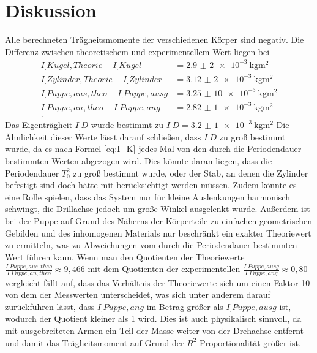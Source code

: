 \section{Diskussion}
\label{sec:Diskussion}
Alle berechneten Trägheitsmomente der verschiedenen Körper sind negativ.
Die Differenz zwischen theoretischem und experimentellem Wert liegen bei
\begin{align*}
I_.{Kugel,Theorie}-I_.{Kugel}		&=\SI{2,9(2)e-3}{\kilo\gram\metre\squared}\\
I_.{Zylinder,Theorie}-I_.{Zylinder}	&=\SI{3,12(2)e-3}{\kilo\gram\metre\squared}\\
I_.{Puppe,aus,theo}-I_.{Puppe,ausg}	&=\SI{3,25(10)e-3}{\kilo\gram\metre\squared}\\
I_.{Puppe,an,theo}-I_.{Puppe,ang}	&=\SI{2,82(1)e-3}{\kilo\gram\metre\squared}\\\text{.}
\end{align*}
Das Eigenträgheit $I_.D$ wurde bestimmt zu $I_.D=\SI{3,2(1)e-3}{\kilo\gram\metre\squared}$
Die Ähnlichkeit dieser Werte lässt darauf schließen, dass $I_.D$ zu groß bestimmt wurde, da es nach Formel \eqref{eq:I_K} jedes Mal von den durch die Periodendauer bestimmten Werten abgezogen wird.\newline
Dies könnte daran liegen, dass die Periodendauer $T_0^2$ zu groß bestimmt wurde, oder der Stab, an denen die Zylinder befestigt sind doch hätte mit berücksichtigt werden müssen. Zudem könnte es eine Rolle spielen, dass das System nur für kleine Auslenkungen harmonisch schwingt, die Drillachse jedoch um große Winkel ausgelenkt wurde.\newline
Außerdem ist bei der Puppe auf Grund des Näherns der Körperteile zu einfachen geometrischen Gebilden und des inhomogenen Materials nur beschränkt ein exakter Theoriewert zu ermitteln, was zu Abweichungen vom durch die Periodendauer bestimmten Wert führen kann.
Wenn man den Quotienten der Theoriewerte $\frac{I_.{Puppe,aus,theo}}{I_.{Puppe,an,theo}}\approx 9,466$
mit dem Quotienten der experimentellen $\frac{I_.{Puppe,ausg}}{I_.{Puppe,ang}}\approx 0,80$
vergleicht fällt auf, dass das Verhältnis der Theoriewerte sich um einen Faktor 10 von dem der Messwerten unterscheidet, was sich unter anderem darauf zurückführen lässt, dass $I_.{Puppe,ang}$ im Betrag größer als $I_.{Puppe,ausg}$ ist, wodurch der Quotient kleiner als 1 wird. Dies ist auch physikalisch sinnvoll, da mit ausgebreiteten Armen ein Teil der Masse weiter von der Drehachse entfernt und damit das Trägheitsmoment auf Grund der $R^2$-Proportionalität größer ist.